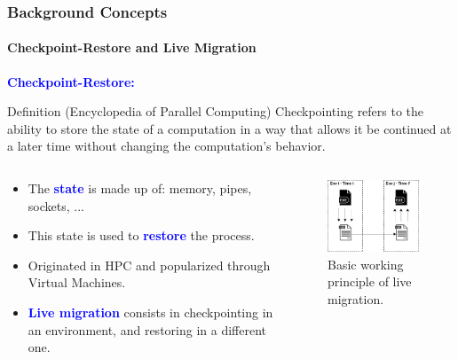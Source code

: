 \documentclass[9pt,    %
    english,            %
    xcolor=table,       %
    envcountsect,        %
    aspectratio=169     %
]{beamer}
\begin{document}
\begin{frame}
    \frametitle{Background Concepts}
    \framesubtitle{Checkpoint-Restore and Live Migration}

    \textcolor{blue}{\textbf{Checkpoint-Restore:}}
    \begin{alertblock}{Definition (Encyclopedia of Parallel Computing)}
        Checkpointing refers to the ability to store the state of a computation in a way that allows it be continued at a later time without changing the computation's behavior.
    \end{alertblock}

    \vspace{-10pt}
    \begin{columns}[t]
        \begin{column}{.65\textwidth}
            \begin{itemize}
                \item The \textbf{\textcolor{blue}{state}} is made up of: memory, pipes, sockets, ...
                \item This state is used to \textbf{\textcolor{blue}{restore}} the process.
                \item Originated in HPC and popularized through Virtual Machines.
                \item \textbf{\textcolor{blue}{Live migration}} consists in checkpointing in an environment, and restoring in a different one.
            \end{itemize}
        \end{column}\hfill
        \begin{column}{.35\textwidth}
            \begin{figure}
                \centering
                \includegraphics[width=.7\textwidth]{./images/cr.png}
                \caption{Basic working principle of live migration.}
            \end{figure}
        \end{column}
    \end{columns}

\end{frame}
\end{document}
